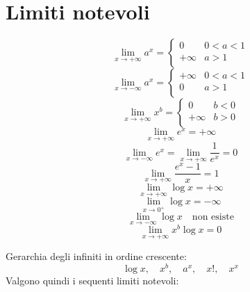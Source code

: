 \documentclass{article}
\begin{document}
\section*{Limiti notevoli}
\setcounter{equation}{0}
\begin{equation}
    \lim_{x\to+\infty}a^x=
    \begin{cases}
        0       & 0<a<1 \\
        +\infty & a>1   \\
    \end{cases}
\end{equation}
\begin{equation}
    \lim_{x\to-\infty}a^x=
    \begin{cases}
        +\infty & 0<a<1 \\
        0       & a>1   \\
    \end{cases}
\end{equation}
\begin{equation}
    \lim_{x\to+\infty}x^b=
    \begin{cases}
        0       & b<0 \\
        +\infty & b>0 \\
    \end{cases}
\end{equation}
\begin{equation}
    \lim_{x\to+\infty}e^x=+\infty
\end{equation}
\begin{equation}
    \lim_{x\to-\infty}e^x=\lim_{x\to+\infty}\frac{1}{e^x}=0
\end{equation}
\begin{equation}
    \lim_{x\to+\infty}\frac{e^x-1}{x}=1
\end{equation}
\begin{equation}
    \lim_{x\to+\infty}\log x=+\infty
\end{equation}
\begin{equation}
    \lim_{x\to0^+}\log x=-\infty
\end{equation}
\begin{equation}
    \lim_{x\to-\infty}\log x \quad\text{non esiste}
\end{equation}
\begin{equation}
    \lim_{x\to+\infty}x^b \log x =0
\end{equation}
\begin{center}
    Gerarchia degli infiniti in ordine crescente:
    \[\log x, \quad x^b, \quad a^x, \quad x!, \quad x^x \]
    Valgono quindi i sequenti limiti notevoli:
\end{center}
\end{document}
